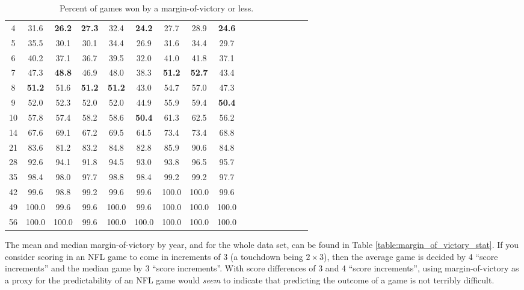 \documentclass[11pt]{article}
\begin{document}
\begin{table}[!htb]
\begin{center}
\begin{tabular}{|c|c|c|c|c|c|c|c|c|c|c|c|c|c|c|c|c|}
4 & 31.6 & \textbf{26.2} & \textbf{27.3} & 32.4 & \textbf{24.2} & 27.7 & 28.9 & \textbf{24.6}\\
5 & 35.5 & 30.1 & 30.1 & 34.4 & 26.9 & 31.6 & 34.4 & 29.7\\
6 & 40.2 & 37.1 & 36.7 & 39.5 & 32.0 & 41.0 & 41.8 & 37.1\\
7 & 47.3 & \textbf{48.8} & 46.9 & 48.0 & 38.3 & \textbf{51.2} & \textbf{52.7} & 43.4\\
8 & \textbf{51.2} & 51.6 & \textbf{51.2} & \textbf{51.2} & 43.0 & 54.7 & 57.0 & 47.3\\
9 & 52.0 & 52.3 & 52.0 & 52.0 & 44.9 & 55.9 & 59.4 & \textbf{50.4}\\
10 & 57.8 & 57.4 & 58.2 & 58.6 & \textbf{50.4} & 61.3 & 62.5 & 56.2\\
14 & 67.6 & 69.1 & 67.2 & 69.5 & 64.5 & 73.4 & 73.4 & 68.8\\
21 & 83.6 & 81.2 & 83.2 & 84.8 & 82.8 & 85.9 & 90.6 & 84.8\\
28 & 92.6 & 94.1 & 91.8 & 94.5 & 93.0 & 93.8 & 96.5 & 95.7\\
35 & 98.4 & 98.0 & 97.7 & 98.8 & 98.4 & 99.2 & 99.2 & 97.7\\
42 & 99.6 & 98.8 & 99.2 & 99.6 & 99.6 & 100.0 & 100.0 & 99.6\\
49 & 100.0 & 99.6 & 99.6 & 100.0 & 99.6 & 100.0 & 100.0 & 100.0\\
56 & 100.0 & 100.0 & 99.6 & 100.0 & 100.0 & 100.0 & 100.0 & 100.0\\
\hline
\end{tabular}
\caption{Percent of games won by a margin-of-victory or less.}\label{table:margin_of_victory}
\end{center}
\end{table}

The mean and median margin-of-victory by year, and for the whole data set, can be found in Table \ref{table:margin_of_victory_stat}. If you consider scoring in an NFL game to come in increments of 3 (a touchdown being $2 \times 3$), then the average game is decided by 4 ``score increments'' and the median game by 3 ``score increments''. With score differences of 3 and 4 ``score increments'', using margin-of-victory as a proxy for the predictability of an NFL game would \emph{seem} to indicate that predicting the outcome of a game is not terribly difficult.
\end{document}
